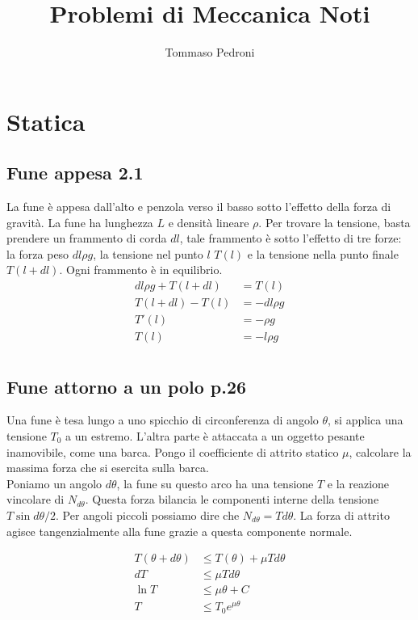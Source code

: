 \documentclass{article}
\title{Problemi di Meccanica Noti}
\author{Tommaso Pedroni}
\begin{document}
\maketitle
\tableofcontents
\clearpage
\section{Statica}
\subsection{Fune appesa 2.1}
La fune è appesa dall'alto e penzola verso il basso sotto
l'effetto della forza di gravità. La fune ha lunghezza $L$ e densità lineare $\rho$. Per trovare la tensione, basta 
prendere un frammento di corda $dl$, tale frammento è sotto l'effetto di tre forze: 
la forza peso $dl\rho g$, la tensione nel punto $l$ $T(l)$ e la tensione nella punto finale $T(l+dl)$.
Ogni frammento è in equilibrio.
\begin{equation}
    \begin{aligned}
        dl\rho g + T(l+dl) &= T(l) \\
        T(l+dl) - T(l) &= -dl\rho g \\
        T'(l) &= -\rho g \\
        T(l) &= -l\rho g \\
    \end{aligned}
\end{equation}

\subsection{Fune attorno a un polo p.26}
Una fune è tesa lungo a uno spicchio di circonferenza di angolo $\theta$, si applica una tensione $T_0$ a un estremo.
L'altra parte è attaccata a un oggetto pesante inamovibile, come una barca. Pongo il coefficiente di attrito statico $\mu$, calcolare 
la massima forza che si esercita sulla barca. \\
Poniamo un angolo $d\theta$, la fune su questo arco ha una tensione $T$ e la reazione vincolare di $N_{d\theta}$. Questa
forza bilancia le componenti interne della tensione $T \sin{d\theta /2}$.
Per angoli piccoli possiamo dire che $N_{d\theta} = Td\theta$. La forza di attrito agisce tangenzialmente alla fune grazie a questa componente normale.

\begin{equation}
    \begin{aligned}
        T(\theta + d\theta) &\le T(\theta) + \mu T d\theta \\
        dT &\le \mu T d \theta \\
        \ln{T} &\le \mu \theta + C \\
        T &\le T_0 e^{\mu \theta}
    \end{aligned}
\end{equation}
\end{document}
